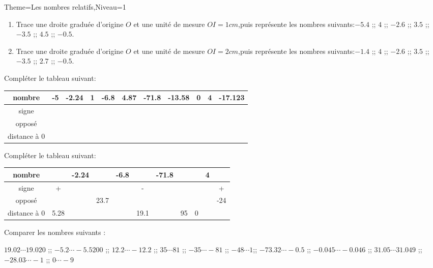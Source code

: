 \documentclass[a4paper,12pt]{article}
\begin{document}
\begin{Maquette}[Fiche]{Theme=Les nombres relatifs,Niveau=1}

\begin{exercice}
\begin{enumerate}
\item Trace une droite graduée d'origine $O$ et une unité de mesure $OI=1cm$,puis représente les nombres suivants:$-5.4$ ;; $4$ ;; $-2.6$ ;; $3.5$ ;; $-3.5$ ;; $4.5$ ;; $-0.5$.
\item  Trace une droite graduée d'origine $O$ et une unité de mesure $OI=2cm$,puis représente les nombres suivants:$-1.4$ ;; $4$ ;; $-2.6$ ;; $3.5$ ;; $-3.5$ ;; $2.7$ ;; $-0.5$.

\end{enumerate}
\end{exercice}

\begin{exercice}
Compléter le tableau suivant:

\begin{tabular}{|c|c|c|c|c|c|c|c|c|c|c|}
\hline 
nombre & -5 & -2.24 & 1 & -6.8 & 4.87 & -71.8 & -13.58 & 0 & 4 & -17.123 \\ 
\hline 
signe &  &  &  &  &  &  &  &  &  &  \\ 
\hline 
opposé &  &  &  &  &  &  &  &  &  &  \\ 
\hline 
distance à $0$ &  &  &  &  &  &  &  &  &  &  \\ 
\hline 
\end{tabular} 
\end{exercice}

\begin{exercice}
Compléter le tableau suivant:

\begin{tabular}{|c|c|c|c|c|c|c|c|c|c|c|}
\hline 
nombre &  & -2.24 &  & -6.8 &  & -71.8 &  &  & 4 &  \\ 
\hline 
signe & + &  &  &  & - &  &  &  &  & + \\ 
\hline 
opposé &  &  & 23.7 &  &  &  &  &  &  & -24 \\ 
\hline 
distance à $0$ & 5.28 &  &  &  & 19.1 &  & 95 & 0 &  &  \\ 
\hline 
\end{tabular} 
\end{exercice}

\begin{exercice}
Comparer les nombres suivants :

$19.02\cdots 19.020$  ;; $-5.2\cdots -5.5200$ ;; $12.2\cdots -12.2$ ;; $35\cdots 81$ ;; $-35\cdots -81$ ;; $-48\cdots 1$;; $-73.32\cdots -0.5$  ;; $-0.045\cdots -0.046$  ;; $31.05\cdots 31.049$ ;; $-28.03\cdots -1$ ;; $0\cdots -9$
\end{exercice}


\end{Maquette}
\end{document}

